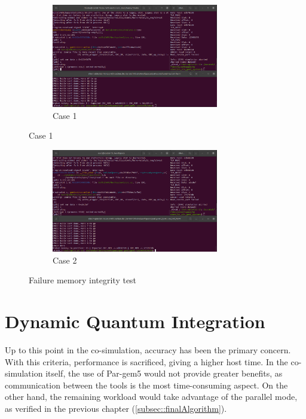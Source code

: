 \begin{figure}[!b]

	\centering
	\begin{subfigure}{\textwidth}
		\centering
		\includegraphics[width=0.8\textwidth]{Images/Failure_MemoryIntegrity1.png}
		\caption{Case 1}
	\end{subfigure}
\end{figure}
\begin{figure}[ht] \ContinuedFloat
	\begin{subfigure}{\textwidth}
		\centering
		\includegraphics[width=0.8\textwidth]{Images/Failure_MemoryIntegrity2.png}
		\caption{Case 2}
	\end{subfigure}

	\caption{Failure memory integrity test}
	\label{fig_Failure_MemoryIntegrity}
\end{figure}


\section{Dynamic Quantum Integration}

Up to this point in the co-simulation, accuracy has been the primary concern. With this criteria, performance is sacrificed, giving a higher
host time. In the co-simulation itself, the use of Par-gem5 would not provide greater benefits, as communication between the tools 
is the most time-consuming aspect. On the other hand, the remaining workload would take advantage of the parallel mode, as verified in the 
previous chapter (\ref{subsec::finalAlgorithm}). 

